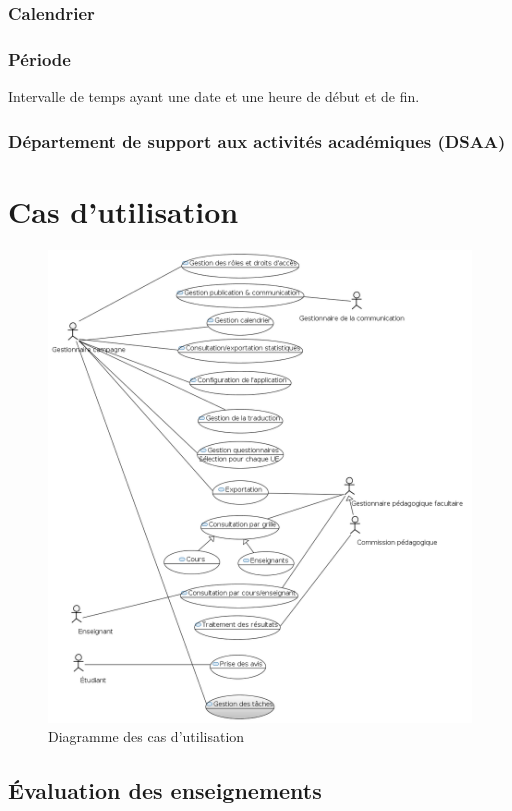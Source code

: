 \documentclass[a4paper,11pt]{report}
\begin{document}
\subsection{Calendrier}

\subsection{Période}
Intervalle de temps ayant une date et une heure de début et de fin.

\subsection{Département de support aux activités académiques (DSAA)}

\chapter{Cas d'utilisation}
\begin{figure}[ht]
\includegraphics[width=\linewidth]{UseCase_Diagram.PNG}
\caption{Diagramme des cas d'utilisation}
\label{fig:usecase-diag}
\end{figure}

\section{Évaluation des enseignements}
\end{document}

